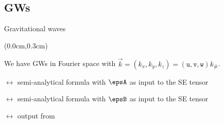 

\subsection{GWs}

\begin{frame}{Gravitational waves}
    \begin{textblock*}{\paperwidth-0.3cm}(0.0cm,0.3cm)
        \begin{flushright}
            \ifOnlyNotes\else
            \fi
        \end{flushright}
    \end{textblock*}

    We have GWs in Fourier space with $\vec{k}=(k_x, k_y, k_z) = (\mathtt{u}, \mathtt{v}, \mathtt{w}) k_\#$. 

    \medskip

    \begin{description}[font=\scshape]
        \item[\descItem{\(\hpA \)}]<2-> $\leftrightarrow$ semi-analytical formula with $\epsA$ as input to the SE tensor
        \item[\descItem{\(\hpB \)}]<2-> $\leftrightarrow$ semi-analytical formula with $\epsB$ as input to the SE tensor
        \item[\descItem{\(\hpC\)}]<3-> $\leftrightarrow$ output from \asgrd
    \end{description}
    
    \bigskip



\begin{notes}[4]
\end{notes}
\end{frame}




